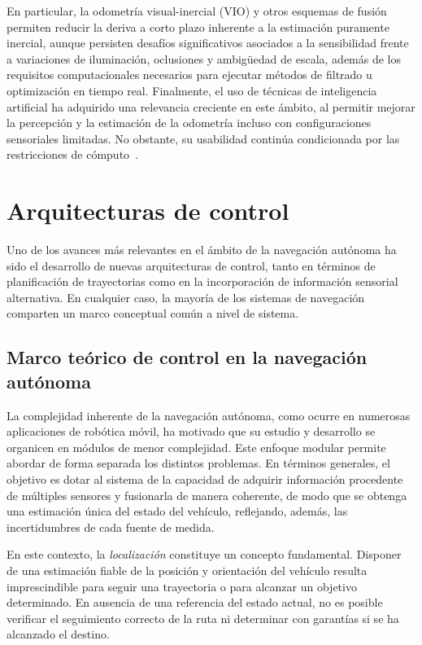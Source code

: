     En particular, la odometría visual-inercial (VIO) y otros esquemas de fusión permiten reducir la deriva a corto plazo inherente a la estimación 
    puramente inercial, aunque persisten desafíos significativos asociados a la sensibilidad frente a variaciones de iluminación, oclusiones 
    y ambigüedad de escala, además de los requisitos computacionales necesarios para ejecutar métodos de filtrado u optimización en tiempo real. 
    Finalmente, el uso de técnicas de inteligencia artificial ha adquirido una relevancia creciente en este ámbito, al permitir mejorar la 
    percepción y la estimación de la odometría incluso con configuraciones sensoriales limitadas. No obstante, su usabilidad continúa 
    condicionada por las restricciones de cómputo~\cite{advancedments-uavs}.


\section{Arquitecturas de control}
    Uno de los avances más relevantes en el ámbito de la navegación autónoma ha sido el desarrollo de nuevas arquitecturas de control, 
    tanto en términos de planificación de trayectorias como en la incorporación de información sensorial alternativa. En cualquier caso, la mayoría de los sistemas de 
    navegación comparten un marco conceptual común a nivel de sistema.

    \subsection{Marco teórico de control en la navegación autónoma}
    La complejidad inherente de la navegación autónoma, como ocurre en numerosas aplicaciones de robótica móvil, ha motivado que su estudio 
    y desarrollo se organicen en módulos de menor complejidad. Este enfoque modular permite abordar de forma separada los distintos 
    problemas. En términos generales, el objetivo es dotar al sistema de la capacidad de 
    adquirir información procedente de múltiples sensores y fusionarla de manera coherente, de modo que se obtenga una estimación única del 
    estado del vehículo, reflejando, además, las incertidumbres de cada fuente de medida.

    En este contexto, la \textit{localización} constituye un concepto fundamental. Disponer de una estimación fiable de la posición y 
    orientación del vehículo resulta imprescindible para seguir una trayectoria o para alcanzar un objetivo determinado. 
    En ausencia de una referencia del estado actual, no es posible verificar el seguimiento correcto de la ruta ni determinar con 
    garantías si se ha alcanzado el destino.

